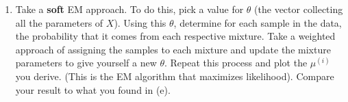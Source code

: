 \documentclass{article}
\begin{document}
\begin{enumerate}
\begin{enumerate}
\item Take a \textbf{soft} EM approach.   To do this, pick a value for $\theta$ (the vector collecting all the parameters of $X$).   Using this $\theta$, determine for each sample in the data, the probability that it comes from each respective mixture.  Take a weighted approach of assigning the samples to each mixture and update the mixture parameters to give yourself a new $\theta$.  Repeat this process and plot the $\mu^{(i)}$ you derive.  (This is the EM algorithm that maximizes likelihood).  Compare your result to what you found in (e).
\end{enumerate}
\end{enumerate}
\end{document}
